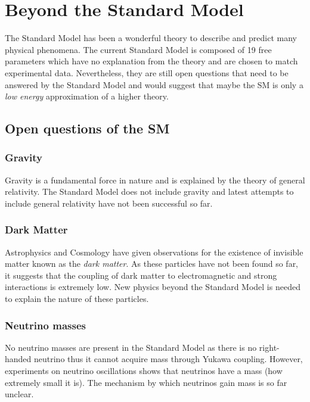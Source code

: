 \section{Beyond the Standard Model}
\label{sec:BeyondSM}

The Standard Model has been a wonderful theory to describe and predict many physical phenomena. The current Standard Model is composed of 19 free parameters which have no explanation from the theory and are chosen to match experimental data. Nevertheless, they are still open questions that need to be answered by the Standard Model and would suggest that maybe the SM is only a \textit{low energy} approximation of a higher theory.

\subsection{Open questions of the SM}

\subsubsection*{Gravity}

Gravity is a fundamental force in nature and is explained by the theory of general relativity. The Standard Model does not include gravity and latest attempts to include general relativity have not been successful so far.

\subsubsection*{Dark Matter}

Astrophysics and Cosmology have given observations for the existence of invisible matter known as the \textit{dark matter}. As these particles have not been found so far, it suggests that the coupling of dark matter to electromagnetic and strong interactions is extremely low. New physics beyond the Standard Model is needed to explain the nature of these particles.

\subsubsection*{Neutrino masses}

No neutrino masses are present in the Standard Model as there is no right-handed neutrino thus it cannot acquire mass through Yukawa coupling. However, experiments on neutrino oscillations \cite{Dore:2008dp} shows that neutrinos have a mass (how extremely small it is). The mechanism by which neutrinos gain mass is so far unclear.


